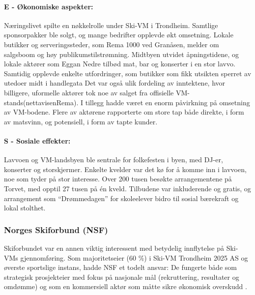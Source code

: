 \paragraph{E - Økonomiske aspekter:}
Næringslivet spilte en nøkkelrolle under Ski-VM i Trondheim. Samtlige sponsorpakker ble solgt, og 
mange bedrifter opplevde økt omsetning\parencite{kom24Sponsorsalg}. Lokale butikker og serveringssteder, som Rema 1000 
ved Granåsen, melder om salgsboom og høy publikumstilstrømning\parencite{nettavisenRema}. Midtbyen utvidet åpningstidene,
og lokale aktører som Eggan Nedre tilbød mat, bar og konserter i en stor lavvo\parencite{midtbyenProgram}. 
Samtidig opplevde enkelte utfordringer, som butikker som fikk utsikten sperret av 
utedoer midt i handlegata\parencite{nettavisenToalett} Det var også ulik fordeling av inntektene, hvor billigere, 
uformelle aktører tok noe av salget fra offisielle VM-stands(nettavisenRema). I tillegg hadde været en enorm påvirkning
på omsetning av VM-bodene. Flere av aktørene rapporterte om store tap både direkte, i form av matsvinn, og
potensiell, i form av tapte kunder\parencite{innherredTragedie}.

\paragraph{S - Sosiale effekter:}
Lavvoen og VM-landsbyen ble sentrale for folkefesten i byen, med DJ-er, konserter og 
storskjermer. Enkelte kvelder var det kø for å komme inn i lavvoen, noe som tyder på stor 
interesse. Over 200 tusen besøkte arrangementene på Torvet, med opptil 27 tusen på én kveld\parencite{wikipediaSkiVM}. 
Tilbudene var inkluderende og gratis, og arrangement som “Drømmedagen” for skoleelever bidro til 
sosial bærekraft og lokal stolthet\parencite{wikipediaSkiVM}.

\subsubsection{Norges Skiforbund (NSF)}
Skiforbundet var en annen viktig interessent med betydelig innflytelse på Ski-VMs gjennomføring.
Som majoritetseier (60 \%) i Ski-VM Trondheim 2025 AS og øverste sportslige instans, hadde
NSF et todelt ansvar: De fungerte både som strategisk prosjekteier med fokus
på nasjonale mål (rekruttering, resultater og omdømme) og som en kommersiell aktør som
måtte sikre økonomisk overskudd \cite{ProffSkiVM2025}.

